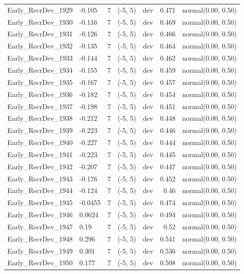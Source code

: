 \documentclass[
]{scrartcl}
\begin{document}
\begin{landscape}
\begin{longtable}{llrllrl}
Early\_RecrDev\_1929 & -0.105 & 7 & (-5, 5) & dev & 0.471 & normal(0.00, 0.50) \\ 
Early\_RecrDev\_1930 & -0.116 & 7 & (-5, 5) & dev & 0.469 & normal(0.00, 0.50) \\ 
Early\_RecrDev\_1931 & -0.126 & 7 & (-5, 5) & dev & 0.466 & normal(0.00, 0.50) \\ 
Early\_RecrDev\_1932 & -0.135 & 7 & (-5, 5) & dev & 0.464 & normal(0.00, 0.50) \\ 
Early\_RecrDev\_1933 & -0.144 & 7 & (-5, 5) & dev & 0.462 & normal(0.00, 0.50) \\ 
Early\_RecrDev\_1934 & -0.155 & 7 & (-5, 5) & dev & 0.459 & normal(0.00, 0.50) \\ 
Early\_RecrDev\_1935 & -0.167 & 7 & (-5, 5) & dev & 0.457 & normal(0.00, 0.50) \\ 
Early\_RecrDev\_1936 & -0.182 & 7 & (-5, 5) & dev & 0.454 & normal(0.00, 0.50) \\ 
Early\_RecrDev\_1937 & -0.198 & 7 & (-5, 5) & dev & 0.451 & normal(0.00, 0.50) \\ 
Early\_RecrDev\_1938 & -0.212 & 7 & (-5, 5) & dev & 0.448 & normal(0.00, 0.50) \\ 
Early\_RecrDev\_1939 & -0.223 & 7 & (-5, 5) & dev & 0.446 & normal(0.00, 0.50) \\ 
Early\_RecrDev\_1940 & -0.227 & 7 & (-5, 5) & dev & 0.444 & normal(0.00, 0.50) \\ 
Early\_RecrDev\_1941 & -0.223 & 7 & (-5, 5) & dev & 0.445 & normal(0.00, 0.50) \\ 
Early\_RecrDev\_1942 & -0.207 & 7 & (-5, 5) & dev & 0.447 & normal(0.00, 0.50) \\ 
Early\_RecrDev\_1943 & -0.176 & 7 & (-5, 5) & dev & 0.452 & normal(0.00, 0.50) \\ 
Early\_RecrDev\_1944 & -0.124 & 7 & (-5, 5) & dev & 0.46 & normal(0.00, 0.50) \\ 
Early\_RecrDev\_1945 & -0.0455 & 7 & (-5, 5) & dev & 0.474 & normal(0.00, 0.50) \\ 
Early\_RecrDev\_1946 & 0.0624 & 7 & (-5, 5) & dev & 0.494 & normal(0.00, 0.50) \\ 
Early\_RecrDev\_1947 & 0.19 & 7 & (-5, 5) & dev & 0.52 & normal(0.00, 0.50) \\ 
Early\_RecrDev\_1948 & 0.296 & 7 & (-5, 5) & dev & 0.541 & normal(0.00, 0.50) \\ 
Early\_RecrDev\_1949 & 0.301 & 7 & (-5, 5) & dev & 0.536 & normal(0.00, 0.50) \\ 
Early\_RecrDev\_1950 & 0.177 & 7 & (-5, 5) & dev & 0.508 & normal(0.00, 0.50) \\ 

\end{longtable}
\end{landscape}
\end{document}
